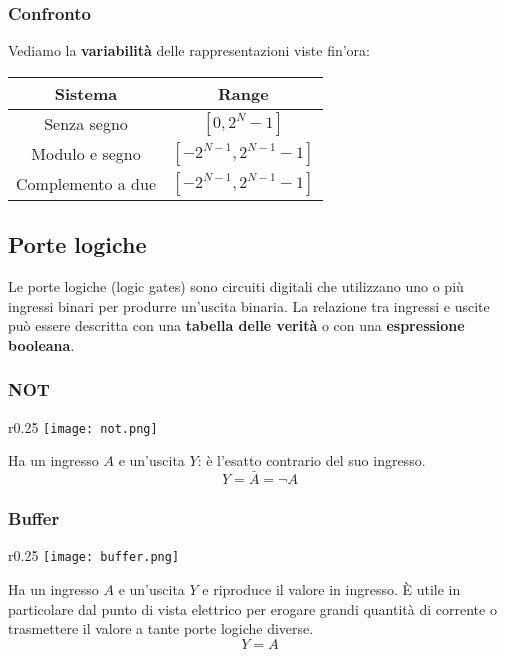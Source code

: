 \subsubsection{Confronto}
Vediamo la \textbf{variabilità} delle rappresentazioni viste fin'ora:
\begin{table}[!h]
	\centering
	\begin{tabular}{|c|c|}
		\hline
		\textbf{Sistema} & \textbf{Range} \\
		\hline
		Senza segno & $[0, 2^N-1]$ \\
		\hline
		Modulo e segno & $[-2^{N-1}, 2^{N-1}-1]$ \\
		\hline
		Complemento a due & $[-2^{N-1}, 2^{N-1}-1]$ \\
		\hline
	\end{tabular}
\end{table}
\newpage
\subsection{Porte logiche}
Le porte logiche (logic gates) sono circuiti digitali che utilizzano uno o più ingressi binari per produrre un’uscita binaria. La relazione tra ingressi e uscite può essere descritta con una \textbf{tabella delle verità} o con una \textbf{espressione booleana}.

\subsubsection{NOT}
\begin{wrapfigure}{r}{0.25\textwidth}
	\texttt{[image: not.png]}
\end{wrapfigure}
Ha un ingresso $A$ e un'uscita $Y$: è l'esatto contrario del suo ingresso.
\begin{equation*}
	Y = \bar{A} = \neg A
\end{equation*}

\subsubsection{Buffer}
\begin{wrapfigure}{r}{0.25\textwidth}
	\texttt{[image: buffer.png]}
\end{wrapfigure}
Ha un ingresso $A$ e un'uscita $Y$ e riproduce il valore in ingresso. È utile in particolare dal punto di vista elettrico per erogare grandi quantità di corrente o trasmettere il valore a tante porte logiche diverse.
\begin{equation*}
	Y = A
\end{equation*}

